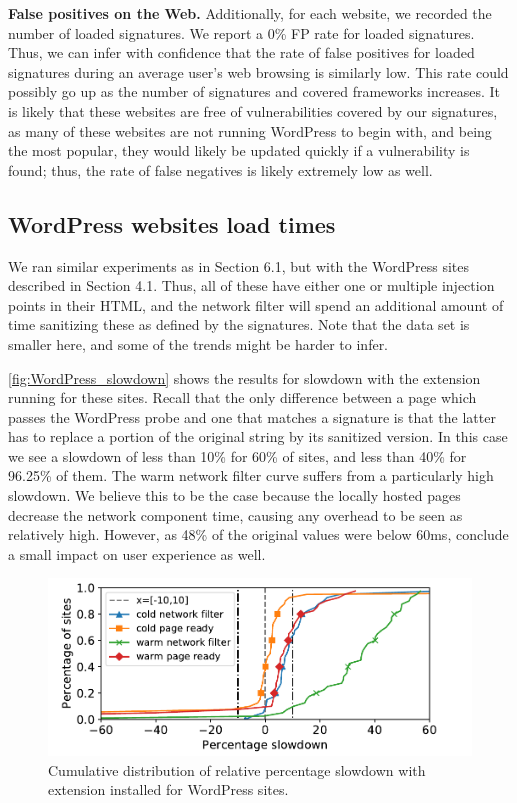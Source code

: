 \textbf{False positives on the Web.} Additionally, for each website, we recorded the number of loaded signatures. We report a 0\% FP rate for loaded signatures. Thus, we can infer with confidence that the rate of false positives for loaded signatures during an average user's web browsing is similarly low. This rate could possibly go up as the number of signatures and covered frameworks increases. It is likely that these websites are free of vulnerabilities covered by our signatures, as many of these websites are not running WordPress to begin with, and being the most popular, they would likely be updated quickly if a vulnerability is found; thus, the rate of false negatives is likely extremely low as well.

\subsection{WordPress websites load times} \label{wordpress_sites}

We ran similar experiments as in Section 6.1, but with the WordPress sites described in Section 4.1. Thus, all of these have either one or multiple injection points in their HTML, and the network filter will spend an additional amount of time sanitizing these as defined by the signatures. Note that the data set is smaller here, and some of the trends might be harder to infer.

\autoref{fig:WordPress_slowdown} shows the results for slowdown with the extension running for these sites. Recall that the only difference between a page which passes the WordPress probe and one that matches a signature is that the latter has to replace a portion of the original string by its sanitized version. In this case we see a slowdown of less than 10\% for 60\% of sites, and less than 40\% for 96.25\% of them. The warm network filter curve suffers from a particularly high slowdown. We believe this to be the case because the locally hosted pages decrease the network component time, causing any overhead to be seen as relatively high. However, as 48\% of the original values were below 60ms, conclude a small impact on user experience as well.

\begin{figure}[h]
	\includegraphics[scale=0.5]{results/extension_slowdown_wordpress_small.pdf}
	\caption{Cumulative distribution of relative percentage slowdown with extension installed for WordPress sites.}
	\label{fig:WordPress_slowdown}
\end{figure}

